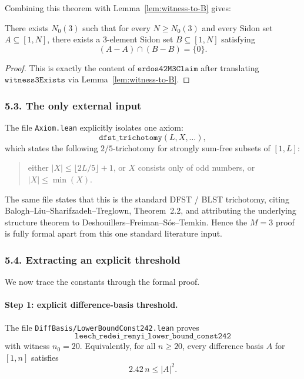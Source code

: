Combining this theorem with Lemma~\ref{lem:witness-to-B} gives:

\begin{theorem}[Complete asymptotic solution of the \(M=3\) case]\label{thm:M3-true}
There exists \(N_0(3)\) such that for every \(N\ge N_0(3)\) and every Sidon set \(A\subseteq[1,N]\), there exists a 3-element Sidon set \(B\subseteq[1,N]\) satisfying
\[
(A-A)\cap(B-B)=\{0\}.
\]
\end{theorem}

\begin{proof}
This is exactly the content of \(\texttt{erdos42M3Claim}\) after translating \(\texttt{witness3Exists}\) via Lemma~\ref{lem:witness-to-B}.
\end{proof}

\subsubsection*{5.3. The only external input}
The file \texttt{Axiom.lean} explicitly isolates one axiom:
\[
\texttt{dfst\_trichotomy}(L,X,\dots),
\]
which states the following \(2/5\)-trichotomy for strongly sum-free subsets of \([1,L]\):
\begin{quote}
either \(|X|\le \lfloor 2L/5\rfloor+1\), or \(X\) consists only of odd numbers, or \(|X|\le \min(X)\).
\end{quote}

The same file states that this is the standard DFST / BLST trichotomy, citing Balogh--Liu--Sharifzadeh--Treglown, Theorem~2.2, and attributing the underlying structure theorem to Deshouillers--Freiman--S\'os--Temkin.  Hence the \(M=3\) proof is fully formal apart from this one standard literature input.

\subsubsection*{5.4. Extracting an explicit threshold}
We now trace the constants through the formal proof.

\paragraph{Step 1: explicit difference-basis threshold.}
The file \texttt{DiffBasis/LowerBoundConst242.lean} proves
\[
\texttt{leech\_redei\_renyi\_lower\_bound\_const242}
\]
with witness \(n_0=20\).  Equivalently, for all \(n\ge 20\), every difference basis \(A\) for \([1,n]\) satisfies
\[
2.42\,n \le |A|^2.
\]

